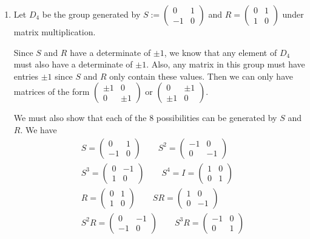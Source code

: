 \documentclass[11pt, reqno]{article}
\begin{document}
\begin{enumerate}
    \item Let $D_4$ be the group generated by $S := \left(\begin{smallmatrix}0 & 1 \\ -1 & 0\end{smallmatrix}\right)$
    and $R = \left(\begin{smallmatrix}0 & 1 \\ 1 & 0\end{smallmatrix}\right)$ under matrix multiplication. 

    Since $S$ and $R$ have a determinate of $\pm 1$, we know that any element of $D_4$ must also have a determinate of $\pm 1$.
    Also, any matrix in this group must have entries $\pm 1$ since $S$ and $R$ only contain these values. Then we can only have matrices of the form
    $\left(\begin{smallmatrix}\pm 1 & 0 \\0 & \pm 1\end{smallmatrix}\right)$ or 
    $\left(\begin{smallmatrix} 0 & \pm 1 \\ \pm 1 & 0\end{smallmatrix}\right)$.

    We must also show that each of the 8 possibilities can be generated by $S$ and $R$. We have 
    \begin{align*}
        & S = \begin{pmatrix}
        0 & 1 \\ -1 & 0
        \end{pmatrix} \qquad
        S^2 = \begin{pmatrix}
            -1 & 0 \\ 0 & -1
        \end{pmatrix}\\
        & S^3 = \begin{pmatrix}
            0 & -1 \\ 1 & 0
        \end{pmatrix}\qquad 
        S^4 = I = \begin{pmatrix}
            1 & 0 \\ 0 & 1
        \end{pmatrix}\\
        & R 
         = \begin{pmatrix}
        0 & 1 \\ 1 & 0 
        \end{pmatrix}\qquad
        SR = \begin{pmatrix}
            1 & 0 \\ 0 & -1
        \end{pmatrix}\\
        & S^2R = \begin{pmatrix}
            0 & -1 \\ -1 & 0
        \end{pmatrix}\qquad 
        S^3R = \begin{pmatrix}
            -1 & 0 \\ 0 & 1
        \end{pmatrix}\\
    \end{align*}
    

\end{enumerate}
\end{document}

